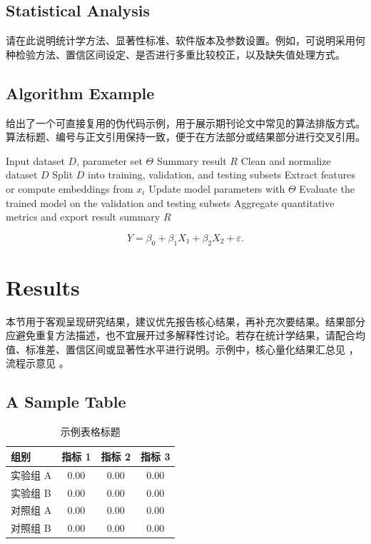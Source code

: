\documentclass[UTF8,11pt,a4paper]{ctexart}
\begin{document}
\subsection{Statistical Analysis}\label{subsec:stats}
请在此说明统计学方法、显著性标准、软件版本及参数设置。例如，可说明采用何种检验方法、置信区间设定、是否进行多重比较校正，以及缺失值处理方式。

\subsection{Algorithm Example}\label{subsec:algorithm}
 给出了一个可直接复用的伪代码示例，用于展示期刊论文中常见的算法排版方式。算法标题、编号与正文引用保持一致，便于在方法部分或结果部分进行交叉引用。

\begin{algorithm}[H]
\caption{示例算法：数据处理与结果生成流程}
\label{alg:pipeline}
\begin{algorithmic}[1]
\Require Input dataset $D$, parameter set $\Theta$
\Ensure Summary result $R$
\State Clean and normalize dataset $D$
\State Split $D$ into training, validation, and testing subsets
  \State Extract features or compute embeddings from $x_i$
  \State Update model parameters with $\Theta$
\EndFor
\State Evaluate the trained model on the validation and testing subsets
\State Aggregate quantitative metrics and export result summary $R$
\end{algorithmic}
\end{algorithm}

\begin{equation}\label{eq:model}
Y = \beta_0 + \beta_1 X_1 + \beta_2 X_2 + \varepsilon.
\end{equation}

\section{Results}\label{sec:results}
本节用于客观呈现研究结果，建议优先报告核心结果，再补充次要结果。结果部分应避免重复方法描述，也不宜展开过多解释性讨论。若存在统计学结果，请配合均值、标准差、置信区间或显著性水平进行说明。示例中，核心量化结果汇总见 ，流程示意见 。

\subsection{A Sample Table}
\begin{table}[H]
\centering
\caption{示例表格标题}
\label{tab:metrics}
\begin{tabular}{lccc}
\toprule
组别 & 指标 1 & 指标 2 & 指标 3 \\
\midrule
实验组 A & 0.00 & 0.00 & 0.00 \\
实验组 B & 0.00 & 0.00 & 0.00 \\
对照组 A & 0.00 & 0.00 & 0.00 \\
对照组 B & 0.00 & 0.00 & 0.00 \\
\bottomrule
\end{tabular}
\end{table}
\end{document}
